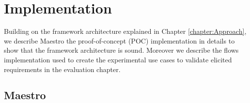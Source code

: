 
\chapter{Implementation}\label{chapter:implementation}
Building on the framework architecture explained in Chapter \ref{chapter:Approach}, we describe Maestro the proof-of-concept (POC) implementation in details to show that the framework architecture is sound. Moreover we describe the flows implementation used to create the experimental use cases to validate elicited requirements in the evaluation chapter.\\

\section{Maestro}


